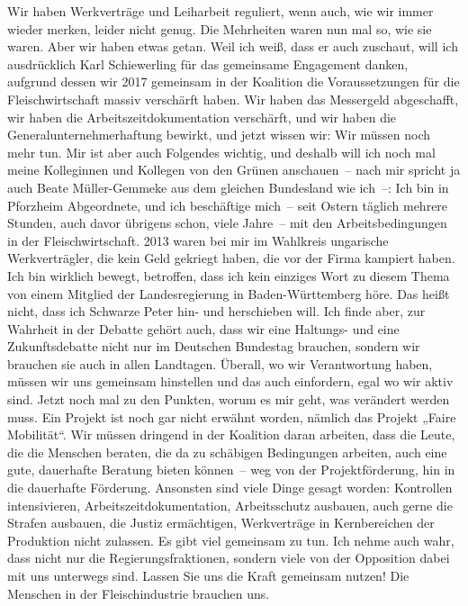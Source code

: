 \documentclass{article}
\begin{document}
Wir haben Werkverträge und Leiharbeit reguliert, wenn auch, wie wir immer wieder merken, leider nicht genug. Die Mehrheiten waren nun mal so, wie sie waren. Aber wir haben etwas getan. Weil ich weiß, dass er auch zuschaut, will ich ausdrücklich Karl Schiewerling für das gemeinsame Engagement danken, aufgrund dessen wir 2017 gemeinsam in der Koalition die Voraussetzungen für die Fleischwirtschaft massiv verschärft haben. Wir haben das Messergeld abgeschafft,  wir haben die Arbeitszeitdokumentation verschärft, und wir haben die Generalunternehmerhaftung bewirkt, und jetzt wissen wir: Wir müssen noch mehr tun. Mir ist aber auch Folgendes wichtig, und deshalb will ich noch mal meine Kolleginnen und Kollegen von den Grünen anschauen – nach mir spricht ja auch Beate Müller-Gemmeke aus dem gleichen Bundesland wie ich –: Ich bin in Pforzheim Abgeordnete, und ich beschäftige mich – seit Ostern täglich mehrere Stunden, auch davor übrigens schon, viele Jahre – mit den Arbeitsbedingungen in der Fleischwirtschaft. 2013 waren bei mir im Wahlkreis ungarische Werkverträgler, die kein Geld gekriegt haben, die vor der Firma kampiert haben. Ich bin wirklich bewegt, betroffen, dass ich kein einziges Wort zu diesem Thema von einem Mitglied der Landesregierung in Baden-Württemberg höre.  Das heißt nicht, dass ich Schwarze Peter hin- und herschieben will. Ich finde aber, zur Wahrheit in der Debatte gehört auch, dass wir eine Haltungs- und eine Zukunftsdebatte nicht nur im Deutschen Bundestag brauchen, sondern wir brauchen sie auch in allen Landtagen. Überall, wo wir Verantwortung haben, müssen wir uns gemeinsam hinstellen und das auch einfordern, egal wo wir aktiv sind.  Jetzt noch mal zu den Punkten, worum es mir geht, was verändert werden muss. Ein Projekt ist noch gar nicht erwähnt worden, nämlich das Projekt „Faire Mobilität“. Wir müssen dringend in der Koalition daran arbeiten, dass die Leute, die die Menschen beraten, die da zu schäbigen Bedingungen arbeiten, auch eine gute, dauerhafte Beratung bieten können – weg von der Projektförderung, hin in die dauerhafte Förderung. Ansonsten sind viele Dinge gesagt worden: Kontrollen intensivieren, Arbeitszeitdokumentation, Arbeitsschutz ausbauen, auch gerne die Strafen ausbauen, die Justiz ermächtigen, Werkverträge in Kernbereichen der Produktion nicht zulassen. Es gibt viel gemeinsam zu tun. Ich nehme auch wahr, dass nicht nur die Regierungsfraktionen, sondern viele von der Opposition dabei mit uns unterwegs sind. Lassen Sie uns die Kraft gemeinsam nutzen! Die Menschen in der Fleischindustrie brauchen uns.  
\end{document}
